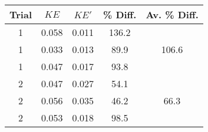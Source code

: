 \begin{tabular}{ | c | c c | c | c | } \hline
    Trial & $KE$ & $KE'$ & \% Diff. & Av. \% Diff. \\ \hline
    1 & 0.058 & 0.011 & 136.2 & \multirow{3}{*}{106.6} \\
    1 & 0.033 & 0.013 & 89.9 & \\
    1 & 0.047 & 0.017 & 93.8 & \\ \hline
    2 & 0.047 & 0.027 & 54.1 & \multirow{3}{*}{66.3} \\
    2 & 0.056 & 0.035 & 46.2 & \\
    2 & 0.053 & 0.018 & 98.5 & \\ \hline
\end{tabular}

